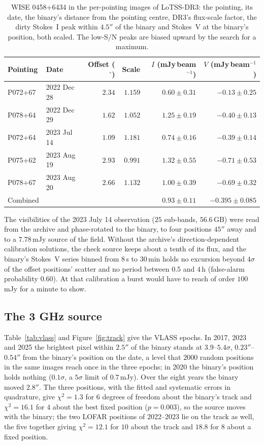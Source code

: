 \documentclass[3p,11pt]{elsarticle}
\newcommand{\mJyb}{mJy\,beam$^{-1}$}
\begin{document}
\begin{table}[t]
\centering\small
\caption{WISE 0458+6434 in the per-pointing images of LoTSS-DR3: the pointing, its date,
the binary's distance from the pointing centre, DR3's flux-scale factor, the dirty
Stokes~I peak within $4.5''$ of the binary and Stokes~V at the binary's position, both
scaled. The low-S/N peaks are biased upward by the search for a maximum.}
\label{tab:lofar}
\begin{tabular}{llrrrr}
\toprule
Pointing & Date & Offset ($^\circ$) & Scale & $I$ (\mJyb) & $V$ (\mJyb) \\
\midrule
P072+67 & 2022 Dec 28 & $2.34$ & $1.159$ & $0.60\pm0.31$ & $-0.13\pm0.25$ \\
P078+64 & 2022 Dec 29 & $1.62$ & $1.052$ & $1.25\pm0.19$ & $-0.40\pm0.13$ \\
P072+64 & 2023 Jul 14 & $1.09$ & $1.181$ & $0.74\pm0.16$ & $-0.39\pm0.14$ \\
P075+62 & 2023 Aug 19 & $2.93$ & $0.991$ & $1.32\pm0.55$ & $-0.71\pm0.53$ \\
P078+67 & 2023 Aug 20 & $2.66$ & $1.132$ & $1.00\pm0.39$ & $-0.69\pm0.32$ \\
\midrule
Combined & & & & $0.93\pm0.11$ & $-0.395\pm0.085$ \\
\bottomrule
\end{tabular}
\end{table}

The visibilities of the 2023 July 14 observation ($25$ sub-bands, $56.6$\,GB) were read
from the archive and phase-rotated to the binary, to four positions $45''$ away and to a
$7.78$\,mJy source of the field. Without the archive's direction-dependent calibration
solutions, the check source keeps about a tenth of its flux, and the binary's Stokes~V
series binned from $8$\,s to $30$\,min holds no excursion beyond $4\sigma$ of the offset
positions' scatter and no period between $0.5$ and $4$\,h (false-alarm probability
$0.60$). At that calibration a burst would have to reach of order $100$\,mJy for a minute
to show.

\subsection{The 3 GHz source}

Table~\ref{tab:vlass} and Figure~\ref{fig:track} give the VLASS epochs. In 2017, 2023
and 2025 the brightest pixel within $2.5''$ of the binary stands at $3.9$--$5.4\sigma$,
$0.23''$--$0.54''$ from the binary's position on the date, a level that $2000$ random
positions in the same images reach once in the three epochs; in 2020 the binary's
position holds nothing ($0.1\sigma$, a $5\sigma$ limit of $0.7$\,mJy). Over the eight
years the binary moved $2.8''$. The three positions, with the fitted and systematic
errors in quadrature, give $\chi^2=1.3$ for $6$ degrees of freedom about the binary's
track and $\chi^2=16.1$ for $4$ about the best fixed position ($p=0.003$), so the source
moves with the binary; the two LOFAR positions of 2022--2023 lie on the track as well,
the five together giving $\chi^2=12.1$ for $10$ about the track and $18.8$ for $8$ about
a fixed position.
\end{document}
